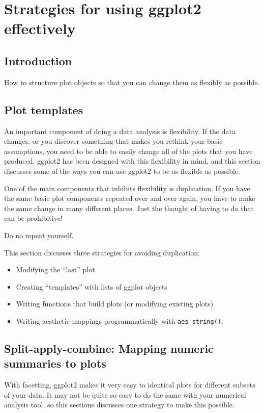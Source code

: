 

\chapter{Strategies for using ggplot2 effectively}
\section{Introduction}


How to structure plot objects so that you can change them as flexibly as possible.

\section{Plot templates}
\label{sec:templates}

An important component of doing a data analysis is flexibility.  If the data changes, or you discover something that makes you rethink your basic assumptions, you need to be able to easily change all of the plots that you have produced.  ggplot2 has been designed with this flexibility in mind, and this section discusses some of the ways you can use ggplot2 to be as flexible as possible.

One of the main components that inhibits flexibility is duplication. If you have the same basic plot components repeated over and over again, you have to make the same change in many different places.  Just the thought of having to do that can be prohibitive!

Do no repeat yourself.

This section discusses three strategies for avoiding duplication:

\begin{itemize}
  \item Modifying the ``last'' plot

  \item Creating ``templates'' with lists of ggplot objects

  \item Writing functions that build plots (or modifying existing plots)

  \item Writing aesthetic mappings programmatically with {\tt aes\_string()}.
\end{itemize}


\section{Split-apply-combine: Mapping numeric summaries to plots}
\label{sec:split_apply_combine}

With facetting, ggplot2 makes it very easy to identical plots for different subsets of your data.  It may not be quite so easy to do the same with your numerical analysis tool, so this sections discusses one strategy to make this possible.  



